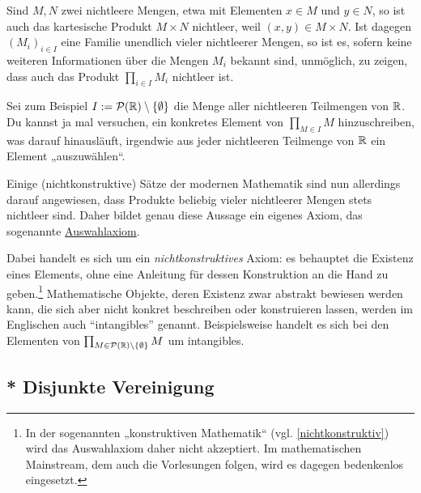 \begin{vorschau}[* Auswahlaxiom] \label{auswahlaxiom}  
    Sind $M,N$ zwei nichtleere Mengen, etwa mit Elementen $x\in M$ und $y\in N$, so ist auch das kartesische Produkt $M\times N$ nichtleer, weil $(x,y)\in M\times N$. Ist dagegen $(M_i)_{i\in I}$ eine Familie unendlich vieler nichtleerer Mengen, so ist es, sofern keine weiteren Informationen über die Mengen $M_i$ bekannt sind, unmöglich, zu zeigen, dass auch das Produkt $\prod_{i\in I} M_i$ nichtleer ist.

    Sei zum Beispiel $I:= \mathcal P(\mathbb R)\setminus \{\emptyset\}$ die Menge aller nichtleeren Teilmengen von $\mathbb R$. Du kannst ja mal versuchen, ein konkretes Element von $\prod_{M\in I} M$ hinzuschreiben, was darauf hinausläuft, irgendwie aus jeder nichtleeren Teilmenge von $\mathbb R$ ein Element „auszuwählen“.

    Einige (nichtkonstruktive) Sätze der modernen Mathematik sind nun allerdings darauf angewiesen, dass Produkte beliebig vieler nichtleerer Mengen stets nichtleer sind. Daher bildet genau diese Aussage ein eigenes Axiom, das sogenannte \href{https://en.wikipedia.org/wiki/Axiom_of_choice}{Auswahlaxiom}.

    Dabei handelt es sich um ein \emph{nichtkonstruktives} Axiom: es behauptet die Existenz eines Elements, ohne eine Anleitung für dessen Konstruktion an die Hand zu geben.\footnote{In der sogenannten „konstruktiven Mathematik“ (vgl. \cref{nichtkonstruktiv}) wird das Auswahlaxiom daher nicht akzeptiert. Im mathematischen Mainstream, dem auch die Vorlesungen folgen, wird es dagegen bedenkenlos eingesetzt.} Mathematische Objekte, deren Existenz zwar abstrakt bewiesen werden kann, die sich aber nicht konkret beschreiben oder konstruieren lassen, werden im Englischen auch ``intangibles'' genannt. Beispielsweise handelt es sich bei den Elementen von $\prod_{M\in \mathcal P(\mathbb R)\setminus \{\emptyset\}} M$ um intangibles.
\end{vorschau}





\subsection*{* Disjunkte Vereinigung}


